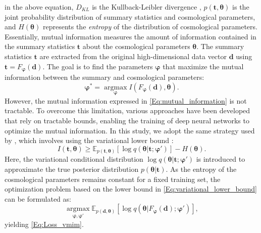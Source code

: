 \documentclass{aa}
\begin{document}
in the above equation, $D_{KL}$ is the Kullback-Leibler divergence \citep{kullback1951information}, $p(\bm {t}, \bm {\theta})$ is the joint probability distribution of summary statistics and cosmological parameters, and $H(\bm {\theta})$ represents the \textit{entropy} of the distribution of cosmological parameters.  
Essentially, mutual information measures the amount of information contained in the summary statistics $\bm t$ about the cosmological parameters $\bm \theta$. The summary statistics $\bm{t}$ are extracted from the original high-dimensional data vector $\bm{d}$ using $\bm{t}=F_{\bm {\varphi}}(\bm{d})$.
The goal is to find the parameters $\bm {\varphi}$ that maximize the mutual information between the summary and cosmological parameters:
\begin{equation}
   \bm {\varphi}^*= \operatorname*{argmax}_{\bm {\varphi}} I(F_{\bm {\varphi}}(\bm{d}), \bm {\theta}).
\end{equation}
However, the mutual information expressed in \autoref{Eq:mutual_information} is not tractable. To overcome this limitation, various approaches have been developed that rely on tractable bounds, enabling the training of deep neural networks to optimize the mutual information. In this study, we adopt the same strategy used by \citet{jeffrey2021likelihood}, which involves using the variational lower bound \citep{barber2003information}:
\begin{equation}\label{Eq:variational_lower_bound}
    I(\bm{t}, \bm{\theta}) \ge \mathbb{E}_{p(\bm {t}, \bm {\theta})} [\log{q(\bm {\theta} |\bm{t} ; \bm{\varphi}')}]- H(\bm {\theta}).
\end{equation}
Here, the variational conditional distribution $\log{q(\bm {\theta} |\bm{t}; \bm{\varphi}')}$ is introduced to approximate the true posterior distribution $p(\bm{\theta}|\bm {t})$. 
As the entropy of the cosmological parameters remains constant for a fixed training set, the optimization problem based on the lower bound in \autoref{Eq:variational_lower_bound} can be formulated as:
\begin{equation}
    \operatorname*{argmax}_{\bm {\varphi}, \bm {\varphi}'}\mathbb{E}_{p(\bm {d}, \bm {\theta})} [\log{q(\bm {\theta} |F_{\bm {\varphi}}(\bm {d}) ; \bm{\varphi}')}], 
\end{equation}
yielding \autoref{Eq:Loss_vmim}.
\end{document}
